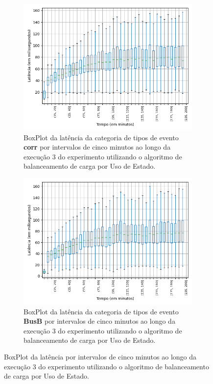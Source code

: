 \begin{figure}
\begin{subfigure}{.5\textwidth}
\centering
\includegraphics[width=\textwidth]{figuras/graphics/boxplot_8-dez-su_corr.png}
\caption{BoxPlot da latência da categoria de tipos de evento \textbf{corr} por intervalos de cinco minutos ao longo da execução 3 do experimento utilizando o algoritmo de balanceamento de carga por Uso de Estado.}
\label{fig:BoxPlot_corr_SU_8-dez-su}
\end{subfigure}%
\begin{subfigure}{.5\textwidth}
\centering
\includegraphics[width=\textwidth]{figuras/graphics/boxplot_8-dez-su_busb.png}
\caption{BoxPlot da latência da categoria de tipos de evento \textbf{BusB} por intervalos de cinco minutos ao longo da execução 3 do experimento utilizando o algoritmo de balanceamento de carga por Uso de Estado.}
\label{fig:BoxPlot_BusB_SU_8-dez-su}
\end{subfigure}%
\caption{BoxPlot da latência por intervalos de cinco minutos ao longo da execução 3 do experimento utilizando o algoritmo de balanceamento de carga por Uso de Estado.}
\end{figure}






